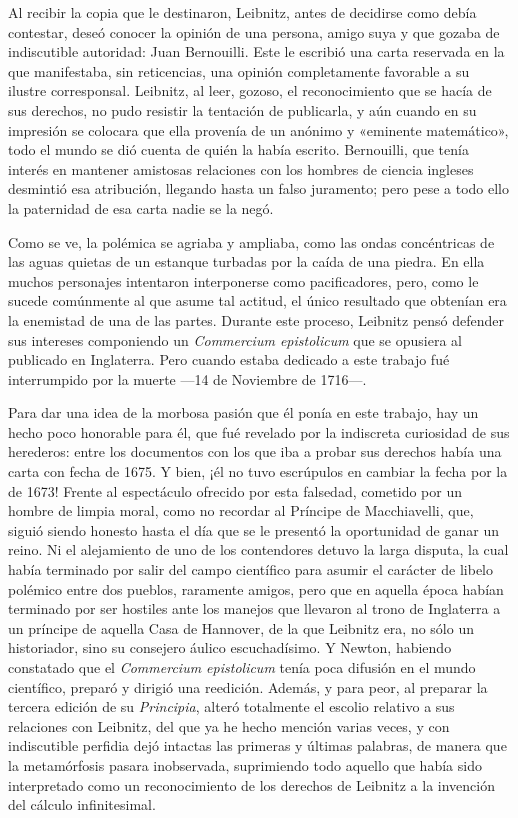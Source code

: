 \documentclass[a4paper, 12pt, draft]{article}
\begin{document}
{Al recibir la copia que le destinaron, Leibnitz, antes de decidirse como debía contestar, deseó conocer la opinión de una persona, amigo suya y que gozaba de indiscutible autoridad: Juan Bernouilli. Este le escribió una carta reservada en la que manifestaba, sin reticencias, una opinión completamente favorable a su ilustre corresponsal. Leibnitz, al leer, gozoso, el reconocimiento que se hacía de sus derechos, no pudo resistir la tentación de publicarla, y aún cuando en su impresión se colocara que ella provenía de un anónimo y «eminente matemático», todo el mundo se dió cuenta de quién la había escrito. Bernouilli, que tenía interés en mantener amistosas relaciones con los hombres de ciencia ingleses desmintió esa atribución, llegando hasta un falso juramento; pero pese a todo ello la paternidad de esa carta nadie se la negó.

Como se ve, la polémica se agriaba y ampliaba, como las ondas concéntricas de las aguas quietas de un estanque turbadas por la caída de una piedra. En ella muchos personajes intentaron interponerse como pacificadores, pero, como le sucede comúnmente al que asume tal actitud, el único resultado que obtenían era la enemistad de una de las partes. Durante este proceso, Leibnitz pensó defender sus intereses componiendo un \textit{ Commercium epistolicum} que se opusiera al publicado en Inglaterra. Pero cuando estaba dedicado a este trabajo fué interrumpido por la muerte ---14 de Noviembre de 1716---.

Para dar una idea de la morbosa pasión que él ponía en este trabajo, hay un hecho poco honorable para él, que fué revelado por la indiscreta curiosidad de sus herederos: entre los documentos con los que iba a probar sus derechos había una carta con fecha de 1675. Y bien, ¡él no tuvo escrúpulos en cambiar la fecha por la de 1673! Frente al espectáculo ofrecido por esta falsedad, cometido por un hombre de limpia moral, como no recordar al Príncipe de Macchiavelli, que, siguió siendo honesto hasta el día que se le presentó la oportunidad de ganar un reino. Ni el alejamiento de uno de los contendores detuvo la larga disputa, la cual había terminado por salir del campo científico para asumir el carácter de libelo polémico entre dos pueblos, raramente amigos, pero que en aquella época habían terminado por ser hostiles ante los manejos que llevaron al trono de Inglaterra a un príncipe de aquella Casa de Hannover, de la que Leibnitz era, no sólo un historiador, sino su consejero áulico escuchadísimo. Y Newton, habiendo constatado que el \textit{ Commercium epistolicum} tenía poca difusión en el mundo científico, preparó y dirigió una reedición. Además, y para peor, al preparar la tercera edición
de su \textit{ Principia}, alteró totalmente el escolio relativo a sus relaciones con Leibnitz, del que ya he hecho mención varias veces, y con indiscutible perfidia dejó intactas las primeras y últimas palabras, de manera que la metamórfosis pasara inobservada, suprimiendo todo aquello que había sido interpretado como un reconocimiento de los derechos de Leibnitz a la invención del cálculo infinitesimal.


}
\end{document}
